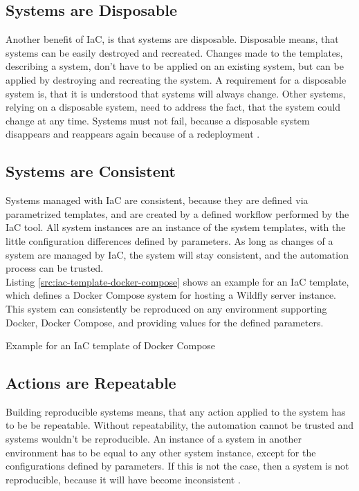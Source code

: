 \subsection{Systems are Disposable}
\label{sec:iac-principles-disposable}
Another benefit of IaC, is that systems are disposable. Disposable means, that systems can be easily destroyed and recreated. Changes made to the templates, describing a system, don't have to be applied on an existing system, but can be applied by destroying and recreating the system. A requirement for a disposable system is, that it is understood that systems will always change. Other systems, relying on a disposable system, need to address the fact, that the system could change at any time. Systems must not fail, because a disposable system disappears and reappears again because of a redeployment \cite{Morris2016}.

\subsection{Systems are Consistent}
\label{sec:iac-principles-consistency}
Systems managed with IaC are consistent, because they are defined via parametrized templates, and are created by a defined workflow performed by the IaC tool. All system instances are an instance of the system templates, with the little configuration differences defined by parameters. As long as changes of a system are managed by IaC, the system will stay consistent, and the automation process can be trusted. \\

Listing \vref{src:iac-template-docker-compose} shows an example for an IaC template, which defines a Docker Compose system for hosting a Wildfly server instance. This system can consistently be reproduced on any environment supporting Docker, Docker Compose, and providing values for the defined parameters\cite{Wildfly2017, DockerCompose2018}. \\

\begin{code}
	\caption{Example for an IaC template of Docker Compose}
	\label{src:iac-template-docker-compose}
\end{code}

\subsection{Actions are Repeatable}
\label{sec:iac-principles-repeatability}
Building reproducible systems means, that any action applied to the system has to be be repeatable. Without repeatability, the automation cannot be trusted and systems wouldn't be reproducible. An instance of a system in another environment has to be equal to any other system instance, except for the configurations defined by parameters. If this is not the case, then a system is not reproducible, because it will have become inconsistent \cite{Morris2016}. \\

